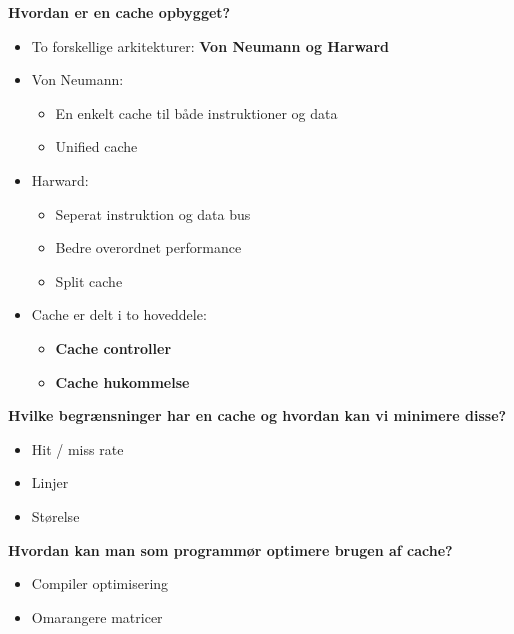 \documentclass{paper}
\begin{document}
\begin{large}\textbf{Hvordan er en cache opbygget?} \end{large}
\begin{itemize}
\item To forskellige arkitekturer: \textbf{Von Neumann og Harward}
\item Von Neumann:
	\begin{itemize}
	\item En enkelt cache til b\aa de instruktioner og data
	\item Unified cache
	\end{itemize}
\item Harward:
	\begin{itemize}
	\item Seperat instruktion og data bus
	\item Bedre overordnet performance
	\item Split cache
	\end{itemize}
\item Cache er delt i to hoveddele:
	\begin{itemize}
	\item \textbf{Cache controller}
	\item \textbf{Cache hukommelse}
	\end{itemize}

\end{itemize}
\begin{large}\textbf{Hvilke begr\ae nsninger har en cache og hvordan kan vi minimere disse?} \end{large}
\begin{itemize}
\item Hit / miss rate
\item Linjer
\item St\o relse
\end{itemize}
\begin{large}\textbf{Hvordan kan man som programm\o r optimere brugen af cache?} \end{large}
\begin{itemize}
\item Compiler optimisering
\item Omarangere matricer\\
\end{itemize}
\end{document}
